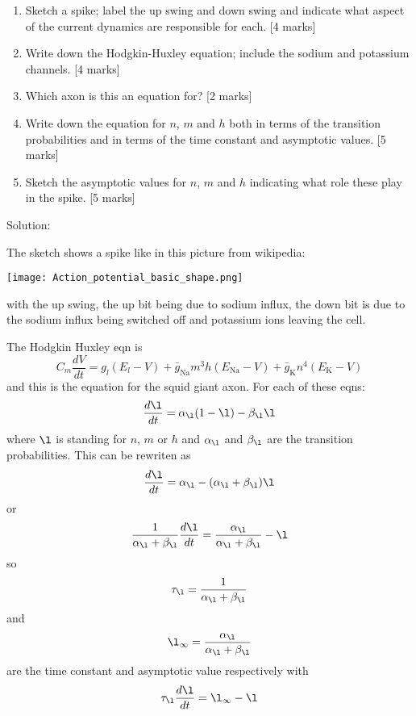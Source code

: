 \documentclass[a4paper,12pt]{article}
\newif\ifsoln
\begin{document}
\begin{enumerate}
\begin{enumerate}
\item Sketch a spike; label the up swing and down swing and indicate
  what aspect of the current dynamics are responsible for each. [4 marks]

\item Write down the Hodgkin-Huxley equation; include the sodium and potassium channels. [4 marks]

\item Which axon is this an equation for? [2 marks]

\item Write down the equation for $n$, $m$ and $h$ both in terms of
  the transition probabilities and in terms of the time constant and
  asymptotic values. [5 marks]

\item Sketch the asymptotic values for $n$, $m$ and $h$ indicating
  what role these play in the spike. [5 marks]

\end{enumerate}

\ifsoln Solution:  

The sketch shows a spike like in this picture from wikipedia:
\begin{center}
\texttt{[image: Action\_potential\_basic\_shape.png]}
\end{center}
with the up swing, the up bit being due to sodium influx, the down bit is due to the sodium influx being switched off and potassium ions leaving the cell.

The Hodgkin Huxley eqn is
\begin{equation}
C_m\frac{dV}{dt}=g_l(E_l-V)+\bar{g}_\text{Na}m^3h(E_\text{Na}-V)+\bar{g}_\text{K}n^4(E_\text{K}-V)
\end{equation}
and this is the equation for the squid giant axon. For each of these eqns:
\begin{equation}
\frac{d\l}{dt} =\alpha_{\l} (1-\l)-\beta_{\l} \l
\end{equation}
where $\l$ is standing for $n$, $m$ or $h$ and $\alpha_{\l}$ and
$\beta_{\l}$ are the transition probabilities. This can be rewriten as
\begin{equation}
\frac{d\l}{dt} =\alpha_{\l}-(\alpha_{\l}+\beta_{\l}) \l
\end{equation}
or
\begin{equation}
\frac{1}{\alpha_{\l}+\beta_{\l}}\frac{d\l}{dt} =\frac{\alpha_{\l}}{\alpha_{\l}+\beta_{\l}}- \l
\end{equation}
so 
\begin{equation}
\tau_{\l}=\frac{1}{\alpha_{\l}+\beta_{\l}}
\end{equation}
and
\begin{equation}
\l_\infty=\frac{\alpha_{\l}}{\alpha_{\l}+\beta_{\l}}
\end{equation}
are the time constant and asymptotic value respectively with
\begin{equation}
\tau_{\l}\frac{d\l}{dt} =\l_\infty- \l
\end{equation}



\end{enumerate}
\end{document}
